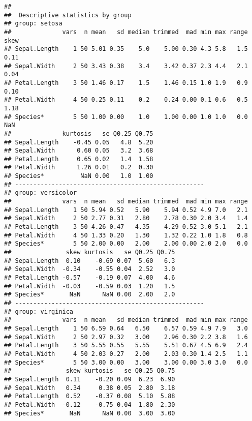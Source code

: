 \documentclass[
  french,
]{book}
\newenvironment{Shaded}{\begin{snugshade}}{\end{snugshade}}
\newcommand{\DataTypeTok}[1]{\textcolor[rgb]{0.13,0.29,0.53}{#1}}
\newcommand{\FloatTok}[1]{\textcolor[rgb]{0.00,0.00,0.81}{#1}}
\newcommand{\KeywordTok}[1]{\textcolor[rgb]{0.13,0.29,0.53}{\textbf{#1}}}
\newcommand{\NormalTok}[1]{#1}
\newcommand{\OperatorTok}[1]{\textcolor[rgb]{0.81,0.36,0.00}{\textbf{#1}}}
\begin{document}
\begin{Shaded}
\end{Shaded}

\begin{verbatim}
## 
##  Descriptive statistics by group 
## group: setosa
##              vars  n mean   sd median trimmed  mad min max range skew
## Sepal.Length    1 50 5.01 0.35    5.0    5.00 0.30 4.3 5.8   1.5 0.11
## Sepal.Width     2 50 3.43 0.38    3.4    3.42 0.37 2.3 4.4   2.1 0.04
## Petal.Length    3 50 1.46 0.17    1.5    1.46 0.15 1.0 1.9   0.9 0.10
## Petal.Width     4 50 0.25 0.11    0.2    0.24 0.00 0.1 0.6   0.5 1.18
## Species*        5 50 1.00 0.00    1.0    1.00 0.00 1.0 1.0   0.0  NaN
##              kurtosis   se Q0.25 Q0.75
## Sepal.Length    -0.45 0.05   4.8  5.20
## Sepal.Width      0.60 0.05   3.2  3.68
## Petal.Length     0.65 0.02   1.4  1.58
## Petal.Width      1.26 0.01   0.2  0.30
## Species*          NaN 0.00   1.0  1.00
## ---------------------------------------------------- 
## group: versicolor
##              vars  n mean   sd median trimmed  mad min max range
## Sepal.Length    1 50 5.94 0.52   5.90    5.94 0.52 4.9 7.0   2.1
## Sepal.Width     2 50 2.77 0.31   2.80    2.78 0.30 2.0 3.4   1.4
## Petal.Length    3 50 4.26 0.47   4.35    4.29 0.52 3.0 5.1   2.1
## Petal.Width     4 50 1.33 0.20   1.30    1.32 0.22 1.0 1.8   0.8
## Species*        5 50 2.00 0.00   2.00    2.00 0.00 2.0 2.0   0.0
##               skew kurtosis   se Q0.25 Q0.75
## Sepal.Length  0.10    -0.69 0.07  5.60   6.3
## Sepal.Width  -0.34    -0.55 0.04  2.52   3.0
## Petal.Length -0.57    -0.19 0.07  4.00   4.6
## Petal.Width  -0.03    -0.59 0.03  1.20   1.5
## Species*       NaN      NaN 0.00  2.00   2.0
## ---------------------------------------------------- 
## group: virginica
##              vars  n mean   sd median trimmed  mad min max range
## Sepal.Length    1 50 6.59 0.64   6.50    6.57 0.59 4.9 7.9   3.0
## Sepal.Width     2 50 2.97 0.32   3.00    2.96 0.30 2.2 3.8   1.6
## Petal.Length    3 50 5.55 0.55   5.55    5.51 0.67 4.5 6.9   2.4
## Petal.Width     4 50 2.03 0.27   2.00    2.03 0.30 1.4 2.5   1.1
## Species*        5 50 3.00 0.00   3.00    3.00 0.00 3.0 3.0   0.0
##               skew kurtosis   se Q0.25 Q0.75
## Sepal.Length  0.11    -0.20 0.09  6.23  6.90
## Sepal.Width   0.34     0.38 0.05  2.80  3.18
## Petal.Length  0.52    -0.37 0.08  5.10  5.88
## Petal.Width  -0.12    -0.75 0.04  1.80  2.30
## Species*       NaN      NaN 0.00  3.00  3.00
\end{verbatim}
\end{document}

